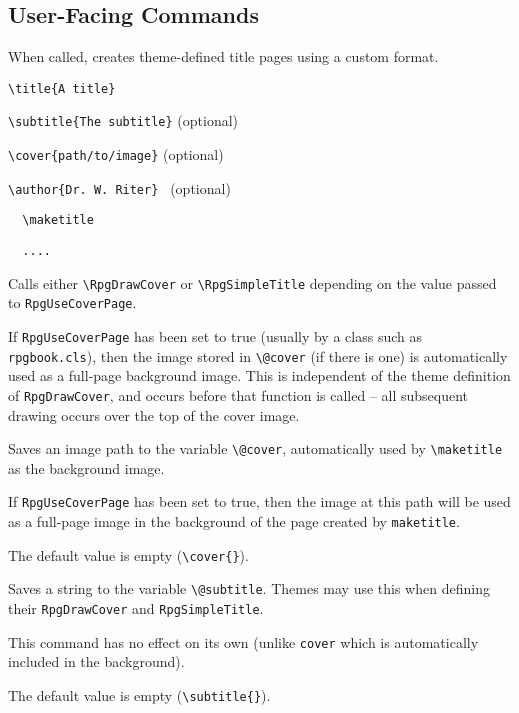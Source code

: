 		\subsection{User-Facing Commands}
			\begin{macrolist}
				\RpgMacro*{\maketitle,{{}}}
					{	
						When called, creates theme-defined title pages using a custom format.
					}{
						\verb|\title{A title}|

						\verb|\subtitle{The subtitle}| (optional)
						
						\verb|\cover{path/to/image}| (optional)
						
						\verb|\author{Dr. W. Riter} | (optional)
						
						\verb||
						
						\verb|	\maketitle|
						
						\verb|	....|
						
						\verb||
					}{
						Calls either \verb|\RpgDrawCover| or \verb|\RpgSimpleTitle| depending on the value passed to \verb|RpgUseCoverPage|.

						If \verb|RpgUseCoverPage| has been set to true (usually by a class such as \verb|rpgbook.cls|), then the image stored in \verb|\@cover| (if there is one) is automatically used as a full-page background image. This is independent of the theme definition of \verb|RpgDrawCover|, and occurs before that function is called -- all subsequent drawing occurs over the top of the cover image.
					}
					{
						Saves an image path to the variable \verb|\@cover|, automatically used by \verb|\maketitle| as the background image.
					}
					{
					}
					{
						If \verb|RpgUseCoverPage| has been set to true, then the image at this path will be used as a full-page image in the background of the page created by \verb|maketitle|.

						The default value is empty (\verb|\cover{}|).
					}
					{
						Saves a string to the variable \verb|\@subtitle|. Themes may use this when defining their \verb|RpgDrawCover| and \verb|RpgSimpleTitle|.
					}
					{
						\subtitle{<string>}
					}
					{
						This command has no effect on its own (unlike \verb|cover| which is automatically included in the background).

						The default value is empty (\verb|\subtitle{}|).
					}
			\end{macrolist}
